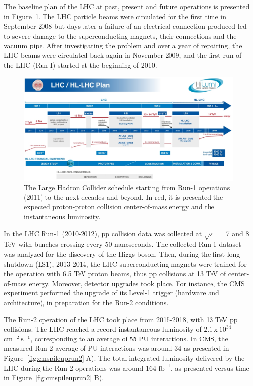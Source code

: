 The baseline plan of the LHC at past, present and future operations is presented in Figure~\ref{fig:lhcschedule}. The LHC particle beams were circulated for the first time in September 2008 but days later a failure of an electrical connection produced led to severe damage to the superconducting magnets, their connections and the vacuum pipe. After investigating the problem and over a year of repairing, the LHC beams were circulated back again in November 2009, and the first run of the LHC (Run-I) started at the beginning of 2010.
\begin{figure}[htp!]
\centering
\includegraphics[width=1.0\textwidth]{Figures/Apparatus/lhcschedule.png}
\caption[The Large Hadron Hadron Collider schedule starting from Run-1 operations (2011) to the next decades and beyond.]{The Large Hadron Collider schedule starting from Run-1 operations (2011) to the next decades and beyond. In red, it is presented the expected proton-proton collision center-of-mass energy and the instantaneous luminosity.}
\label{fig:lhcschedule}
\end{figure}

In the LHC Run-1 (2010-2012), pp collision data was collected at $\sqrt{s}=$ 7 and 8 TeV with bunches crossing every 50 nanoseconds. The collected Run-1 dataset was analyzed for the discovery of the Higgs boson. Then, during the first long shutdown (LS1), 2013-2014, the LHC superconducting magnets were trained for the operation with 6.5 TeV proton beams, thus pp collisions at 13 TeV of center-of-mass energy. Moreover, detector upgrades took place. For instance, the CMS experiment performed the upgrade of its Level-1 trigger (hardware and architecture), in preparation for the Run-2 conditions.

The Run-2 operation of the LHC took place from 2015-2018, with 13 TeV pp collisions. The LHC reached a record instantaneous luminosity of $\mathrm{2.1~x~10^{34}}$ $\mathrm{cm^{-2}~s^{-1}}$, corresponding to an average of $55$ PU interactions. In CMS, the measured Run-2 average of PU interactions was around 34 as presented in Figure~\ref{fig:cmspileuprun2} A). The total integrated luminosity delivered by the LHC during the Run-2 operations was around 164 $\mathrm{fb^{-1}}$, as presented versus time in Figure~\ref{fig:cmspileuprun2} B). 

